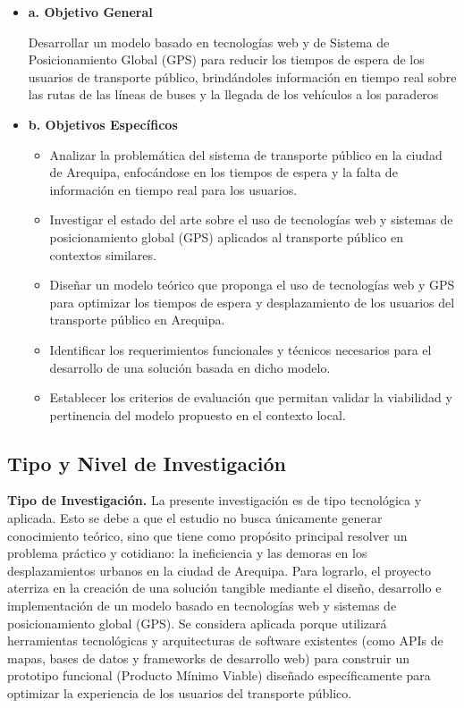 \begin{itemize}
    \item \textbf{a. Objetivo General}

    Desarrollar un modelo basado en tecnologías web y de Sistema de Posicionamiento Global (GPS) para reducir los tiempos de espera de los usuarios de transporte público, brindándoles información en tiempo real sobre las rutas de las líneas de buses y la llegada de los vehículos a los paraderos

    \item \textbf{b. Objetivos Específicos}
    \begin{itemize}
        \item {Analizar la problemática del sistema de transporte público en la ciudad de Arequipa, enfocándose en los tiempos de espera y la falta de información en tiempo real para los usuarios.}
        \item {Investigar el estado del arte sobre el uso de tecnologías web y sistemas de posicionamiento global (GPS) aplicados al transporte público en contextos similares.}
        \item {Diseñar un modelo teórico que proponga el uso de tecnologías web y GPS para optimizar los tiempos de espera y desplazamiento de los usuarios del transporte público en Arequipa.}
        \item {Identificar los requerimientos funcionales y técnicos necesarios para el desarrollo de una solución basada en dicho modelo.}
        \item {Establecer los criterios de evaluación que permitan validar la viabilidad y pertinencia del modelo propuesto en el contexto local.}
    \end{itemize}
\end{itemize}


\subsection{Tipo y Nivel de Investigación}

\textbf{Tipo de Investigación.} La presente investigación es de tipo tecnológica y aplicada. Esto se debe a que el estudio no busca únicamente generar conocimiento teórico, sino que tiene como propósito principal resolver un problema práctico y cotidiano: la ineficiencia y las demoras en los desplazamientos urbanos en la ciudad de Arequipa. Para lograrlo, el proyecto aterriza en la creación de una solución tangible mediante el diseño, desarrollo e implementación de un modelo basado en tecnologías web y sistemas de posicionamiento global (GPS). Se considera aplicada porque utilizará herramientas tecnológicas y arquitecturas de software existentes (como APIs de mapas, bases de datos y frameworks de desarrollo web) para construir un prototipo funcional (Producto Mínimo Viable) diseñado específicamente para optimizar la experiencia de los usuarios del transporte público.

